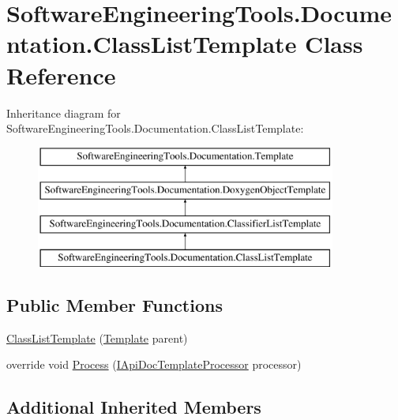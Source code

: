 \hypertarget{class_software_engineering_tools_1_1_documentation_1_1_class_list_template}{\section{Software\+Engineering\+Tools.\+Documentation.\+Class\+List\+Template Class Reference}
\label{class_software_engineering_tools_1_1_documentation_1_1_class_list_template}
}
Inheritance diagram for Software\+Engineering\+Tools.\+Documentation.\+Class\+List\+Template\+:\begin{figure}[H]
\begin{center}
\leavevmode
\includegraphics[height=4.000000cm]{class_software_engineering_tools_1_1_documentation_1_1_class_list_template}
\end{center}
\end{figure}
\subsection*{Public Member Functions}
\begin{DoxyCompactItemize}
\item 
\hyperlink{class_software_engineering_tools_1_1_documentation_1_1_class_list_template_a722a03a1b38c55ff5bdb88abba363d6f}{Class\+List\+Template} (\hyperlink{class_software_engineering_tools_1_1_documentation_1_1_template}{Template} parent)
\item 
override void \hyperlink{class_software_engineering_tools_1_1_documentation_1_1_class_list_template_a310a651d73cc35f939bf302fd5233172}{Process} (\hyperlink{interface_software_engineering_tools_1_1_documentation_1_1_i_api_doc_template_processor}{I\+Api\+Doc\+Template\+Processor} processor)
\end{DoxyCompactItemize}
\subsection*{Additional Inherited Members}



